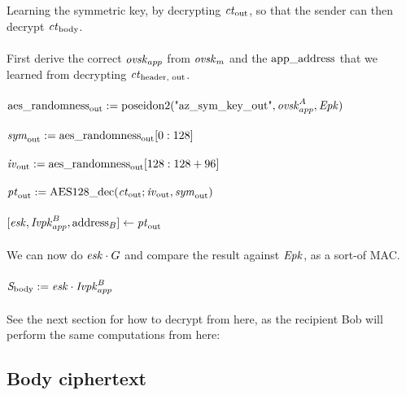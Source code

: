 Learning the symmetric key, by decrypting $\ctout$, so that the sender can then decrypt $\ctbody$.\\
\\
First derive the correct $\ovskapp$ from $\ovskm$ and the $\appaddress$ that we learned from decrypting $\ctheaderout$.\\
\\
$\aesrandomnessout := \poseidon(\text{"az\_sym\_key\_out"}, \ovskapp^A, \Epk)$\\
\\
$\symkeyout := \aesrandomnessout[0:128]$\\
\\
$\ivout := \aesrandomnessout[128:128 + 96]$\\
\\
$\ptout := \aesdecrypt(\ctout; \ivout, \symkeyout)$\\
\\
$[\esk, \Ivpkapp^B, \address_B]\leftarrow \ptout$\\
\\
We can now do $\esk \cdot G$ and compare the result against $\Epk$, as a sort-of MAC.
\\
\\
$\sharedsecretbody := \esk \cdot \Ivpkapp^B$\\
\\
See the next section for how to decrypt from here, as the recipient Bob will perform the same computations from here:



\subsection{Body ciphertext}

